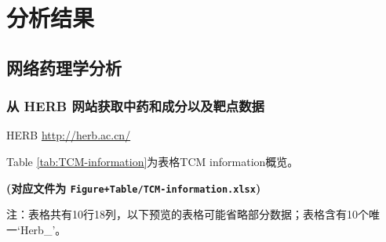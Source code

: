 \documentclass[
]{article}
\begin{document}
\hypertarget{results}{%
\section{分析结果}\label{results}}

\hypertarget{ux7f51ux7edcux836fux7406ux5b66ux5206ux6790}{%
\subsection{网络药理学分析}\label{ux7f51ux7edcux836fux7406ux5b66ux5206ux6790}}

\hypertarget{ux4ece-herb-ux7f51ux7ad9ux83b7ux53d6ux4e2dux836fux548cux6210ux5206ux4ee5ux53caux9776ux70b9ux6570ux636e}{%
\subsubsection{从 HERB 网站获取中药和成分以及靶点数据}\label{ux4ece-herb-ux7f51ux7ad9ux83b7ux53d6ux4e2dux836fux548cux6210ux5206ux4ee5ux53caux9776ux70b9ux6570ux636e}}

HERB \url{http://herb.ac.cn/}

Table \ref{tab:TCM-information}为表格TCM information概览。

\textbf{(对应文件为 \texttt{Figure+Table/TCM-information.xlsx})}

\begin{center}\begin{tcolorbox}[colback=gray!10, colframe=gray!50, width=0.9\linewidth, arc=1mm, boxrule=0.5pt]注：表格共有10行18列，以下预览的表格可能省略部分数据；表格含有10个唯一`Herb\_'。
\end{tcolorbox}
\end{center}
\end{document}
